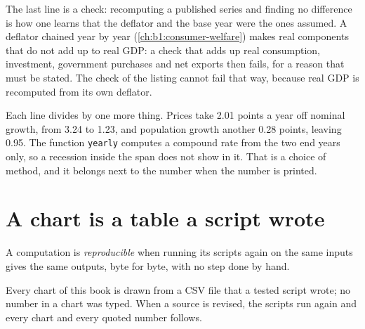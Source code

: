 \label{out:b1:economic-data-python:deflate}

The last line is a check: recomputing a published series and finding no
difference is how one learns that the deflator and the base year were the
ones assumed. A deflator chained year by year (\cref{ch:b1:consumer-welfare})
makes real components that do not add up to real GDP: a check that adds up
real consumption, investment, government purchases and net exports then
fails, for a reason that must be stated. The check of the listing cannot
fail that way, because real GDP is recomputed from its own deflator.

\label{lst:b1:economic-data-python:per-person}

\label{out:b1:economic-data-python:per-person}

Each line divides by one more thing. Prices take 2.01 points a year off
nominal growth, from 3.24 to 1.23, and population growth another 0.28 points,
leaving 0.95. The function \texttt{yearly} computes a compound rate from the
two end years only, so a recession inside the span does not show in it.
That is a choice of method, and it belongs next to the number when the
number is printed.

\section{A chart is a table a script wrote}\label{sec:b1:economic-data-python:reproducible}

\begin{definition}\label{def:b1:economic-data-python:reproducible}
A computation is \emph{reproducible} when running its scripts again on the
same inputs gives the same outputs, byte for byte, with no step done by
hand.
\end{definition}

Every chart of this book is drawn from a CSV file that a tested script
wrote; no number in a chart was typed. When a source is revised, the
scripts run again and every chart and every quoted number follows.


